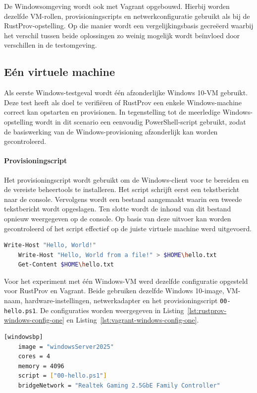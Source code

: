 De Windowsomgeving wordt ook met Vagrant opgebouwd. Hierbij worden dezelfde VM-rollen, provisioningscripts en netwerkconfiguratie gebruikt als bij de RustProv-opstelling. Op die manier wordt een vergelijkingsbasis gecreëerd waarbij het verschil tussen beide oplossingen zo weinig mogelijk wordt beïnvloed door verschillen in de testomgeving.

\subsection{Eén virtuele machine}

Als eerste Windows-testgeval wordt één afzonderlijke Windows 10-VM gebruikt. Deze test heeft als doel te verifiëren of RustProv een enkele Windows-machine correct kan opstarten en provisionen. In tegenstelling tot de meerledige Windows-opstelling wordt in dit scenario een eenvoudig PowerShell-script gebruikt, zodat de basiswerking van de Windows-provisioning afzonderlijk kan worden gecontroleerd.

\paragraph{Provisioningscript}

Het provisioningscript wordt gebruikt om de Windows-client voor te bereiden en de vereiste beheertools te installeren. Het script schrijft eerst een tekstbericht naar de console. Vervolgens wordt een bestand aangemaakt waarin een tweede tekstbericht wordt opgeslagen. Ten slotte wordt de inhoud van dit bestand opnieuw weergegeven op de console. Op basis van deze uitvoer kan worden gecontroleerd of het script effectief op de juiste virtuele machine werd uitgevoerd.

\begin{lstlisting}[language=bash,caption={Provisioningscript voor één Windows-VM.},label={lst:bpwindows}]
    Write-Host "Hello, World!"
    Write-Host "Hello, World from a file!" > $HOME\hello.txt
    Get-Content $HOME\hello.txt
\end{lstlisting}

Voor het experiment met één Windows-VM werd dezelfde configuratie opgesteld voor RustProv en Vagrant. Beide gebruiken dezelfde Windows 10-image, VM-naam, hardware-instellingen, netwerkadapter en het provisioningscript \texttt{00-hello.ps1}. De configuraties worden weergegeven in Listing~\ref{lst:rustprov-windows-config-one} en Listing~\ref{lst:vagrant-windows-config-one}.

\begin{lstlisting}[language=bash,caption={RustProv-configuratie voor één Windows-VM.},label={lst:rustprov-windows-config-one}]
    [windowsbp]
    image = "windowsServer2025"
    cores = 4
    memory = 4096
    script = ["00-hello.ps1"]
    bridgeNetwork = "Realtek Gaming 2.5GbE Family Controller"
\end{lstlisting}

